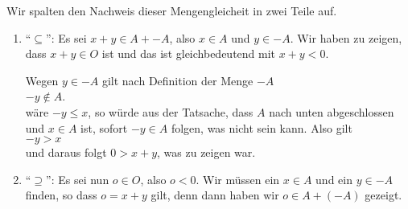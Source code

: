\proof
  Wir spalten den Nachweis dieser Mengengleicheit in zwei Teile auf.
\begin{enumerate}
\item ``$\subseteq$'':  Es sei $x + y \in A + -\!A$, also $x \in A$ und $y \in -A$.
      Wir haben zu zeigen, dass $x + y \in O$ ist und das ist gleichbedeutend mit $x + y < 0$.

      Wegen $y \in -\!A$ gilt nach Definition der Menge $-\!A$
      \\[0.2cm]
      \hspace*{1.3cm}
      $-y \not \in A$.
      \\[0.2cm]
      wäre $-y \leq x$, so würde aus der Tatsache, dass $A$ nach unten abgeschlossen und $x \in A$
      ist, sofort $-y \in A$ folgen, was nicht sein kann.  Also gilt
      \\[0.2cm]
      \hspace*{1.3cm}
      $-y > x$
      \\[0.2cm]
      und daraus folgt $0 > x + y$, was zu zeigen war.
\item ``$\supseteq$'': Es sei nun $o \in O$, also $o < 0$.  Wir müssen ein $x \in A$ und ein $y \in -A$
      finden, so dass $o = x + y$ gilt, denn dann haben wir $o \in A + (-A)$ gezeigt.


\end{enumerate}

